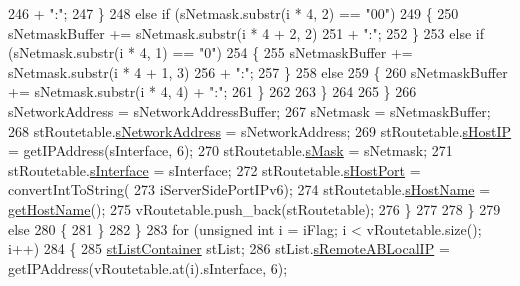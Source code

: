 \begin{DoxyCode}
246                                     + \textcolor{stringliteral}{":"};
247                         \}
248                         \textcolor{keywordflow}{else} \textcolor{keywordflow}{if} (sNetmask.substr(i * 4, 2) == \textcolor{stringliteral}{"00"})
249                         \{
250                             sNetmaskBuffer += sNetmask.substr(i * 4 + 2, 2)
251                                     + \textcolor{stringliteral}{":"};
252                         \}
253                         \textcolor{keywordflow}{else} \textcolor{keywordflow}{if} (sNetmask.substr(i * 4, 1) == \textcolor{stringliteral}{"0"})
254                         \{
255                             sNetmaskBuffer += sNetmask.substr(i * 4 + 1, 3)
256                                     + \textcolor{stringliteral}{":"};
257                         \}
258                         \textcolor{keywordflow}{else}
259                         \{
260                             sNetmaskBuffer += sNetmask.substr(i * 4, 4) + \textcolor{stringliteral}{":"};
261                         \}
262 
263                     \}
264 
265                 \}
266                 sNetworkAddress = sNetworkAddressBuffer;
267                 sNetmask = sNetmaskBuffer;
268                 stRoutetable.\hyperlink{structstRoutetable_af2c8c267f263fa0065ea71714550e846}{sNetworkAddress} = sNetworkAddress;
269                 stRoutetable.\hyperlink{structstRoutetable_a5cdcd38c1c8a9fd2bb7a34b5550a5f8c}{sHostIP} = getIPAddress(sInterface, 6);
270                 stRoutetable.\hyperlink{structstRoutetable_a14f14d5a55c22279a8cfb7452c6e1148}{sMask} = sNetmask;
271                 stRoutetable.\hyperlink{structstRoutetable_a02604c87af267a30c992c3c8f8e8366a}{sInterface} = sInterface;
272                 stRoutetable.\hyperlink{structstRoutetable_a48bafcc14c088a68e976dd9a260dd6dd}{sHostPort} = convertIntToString(
273                         iServerSidePortIPv6);
274                 stRoutetable.\hyperlink{structstRoutetable_a7e4e8ff4c0d99dde9f168795056ae06c}{sHostName} = \hyperlink{classLocalNetworkInformation_a63cf18e0d7cdc14426e4999ef397c981}{getHostName}();
275                 vRoutetable.push\_back(stRoutetable);
276             \}
277 
278         \}
279         \textcolor{keywordflow}{else}
280         \{
281         \}
282     \}
283     \textcolor{keywordflow}{for} (\textcolor{keywordtype}{unsigned} \textcolor{keywordtype}{int} i = iFlag; i < vRoutetable.size(); i++)
284     \{
285         \hyperlink{structstListContainer}{stListContainer} stList;
286         stList.\hyperlink{structstListContainer_a661224bc268bac73ea4c4f179626f04b}{sRemoteABLocalIP} = getIPAddress(vRoutetable.at(i).sInterface, 6);

\end{DoxyCode}
